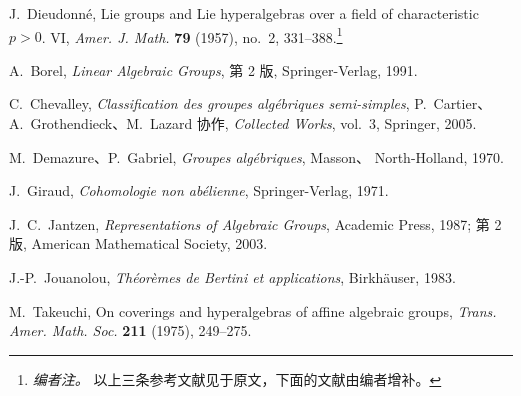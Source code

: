 \smallskip\noindent[Di57]\enspace
J.~Dieudonné, Lie groups and Lie hyperalgebras over a field of
characteristic \(p>0\). VI, \textit{Amer. J. Math.} \textbf{79}
(1957), no.~2, 331--388.\footnote{\textit{编者注。} 以上三条参考文献见于原文，下面的文献由编者增补。}\par

\smallskip\noindent[Bo91]\enspace
A.~Borel, \textit{Linear Algebraic Groups}, 第 2 版,
Springer-Verlag, 1991.\par

\smallskip\noindent[Ch05]\enspace
C.~Chevalley, \textit{Classification des groupes algébriques
semi-simples}, P.~Cartier、A.~Grothendieck、M.~Lazard 协作,
\textit{Collected Works}, vol.~3,
Springer, 2005.\par

\smallskip\noindent[DG70]\enspace
M.~Demazure、P.~Gabriel, \textit{Groupes algébriques}, Masson、
North-Holland, 1970.\par

\smallskip\noindent[Gi71]\enspace
J.~Giraud, \textit{Cohomologie non abélienne}, Springer-Verlag,
1971.\par

\smallskip\noindent[Ja87]\enspace
J.~C.~Jantzen, \textit{Representations of Algebraic Groups}, Academic
Press, 1987; 第 2 版, American Mathematical Society, 2003.\par

\smallskip\noindent[Jou83]\enspace
J.-P.~Jouanolou, \textit{Théorèmes de Bertini et applications},
Birkhäuser, 1983.\par

\smallskip\noindent[Ta75]\enspace
M.~Takeuchi, On coverings and hyperalgebras of affine algebraic
groups, \textit{Trans. Amer. Math. Soc.} \textbf{211} (1975),
249--275.\par
